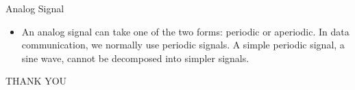 \documentclass[pdflatex,compress]{beamer}
\begin{document}
\begin{frame}{Analog Signal}
	\begin{itemize}
		\item An analog signal can take one of the two forms: periodic or aperiodic. In data communication, we normally use periodic signals. A simple periodic signal, a sine wave, cannot be decomposed into simpler signals.
	\end{itemize}
\end{frame}

\begin{frame}
	\centering
	THANK YOU
\end{frame}


\end{document}
